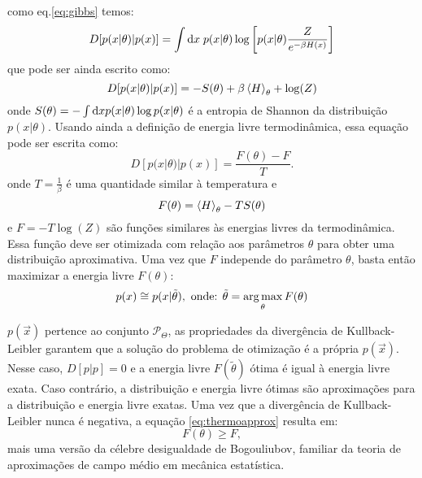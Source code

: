  como eq.\eqref{eq:gibbs} temos:
\begin{equation*}
 D[ p(x|\theta)|p(x) ] = \int \mathrm{d} x\; p(x|\theta) \log\left[p(x|\theta)\frac{Z}{e^{-\beta H(x)}}\right]
\end{equation*}
que pode ser ainda escrito como:
\[
 D[ p(x|\theta)|p(x) ] = - S(\theta)  + \beta \left\langle H \right\rangle_{\theta}  + \log(Z)
\]
onde $S(\theta) = - \int \mathrm{d} x p(x|\theta) \log p(x|\theta)$ é a entropia de Shannon da distribuição $p(x|\theta)$. Usando ainda a definição de energia livre termodinâmica, essa equação pode ser escrita como:
\begin{equation}
\label{eq:thermoapprox}
 D[ p(x|\theta)|p(x) ] = \dfrac{F(\theta) - F}{T}.
\end{equation}
onde $T = \frac{1}{\beta}$ é uma quantidade similar à temperatura e 
\begin{equation}
\label{eq:freenergy}
F(\theta) = \avg{H}_{\theta} - T S(\theta) 
\end{equation}
e $F = -T\log(Z)$ são funções similares às energias livres da termodinâmica. Essa função deve ser otimizada com relação aos parâmetros $\theta$ para obter uma distribuição aproximativa. Uma vez que $F$ independe do parâmetro $\theta$, basta então maximizar a energia livre $F(\theta)$:
\begin{equation}
p(x) \cong p(x | \tilde{\theta}), \text{   onde: } \tilde{\theta} = \operatorname*{arg\,max}_{\theta} F(\theta)
\end{equation}

 $p(\vec{x})$ pertence ao conjunto $\mathcal{P}_\Theta$, as propriedades da divergência de Kullback-Leibler garantem que a solução do problema de otimização é a própria $p(\vec{x})$. Nesse caso, $D[p|p] = 0$ e a energia livre $F(\tilde{\theta})$ ótima é igual à energia livre exata. Caso contrário, a distribuição e energia livre ótimas são aproximações para a distribuição e energia livre exatas. Uma vez que a divergência de Kullback-Leibler nunca é negativa, a equação \eqref{eq:thermoapprox} resulta em:
\begin{equation}
 \label{eq:bogouliubov}
  F(\theta) \ge F,
\end{equation}
mais uma versão da célebre desigualdade de Bogouliubov, familiar da teoria de aproximações de campo médio em mecânica estatística\cite[-3cm]{Salinas1997}.


